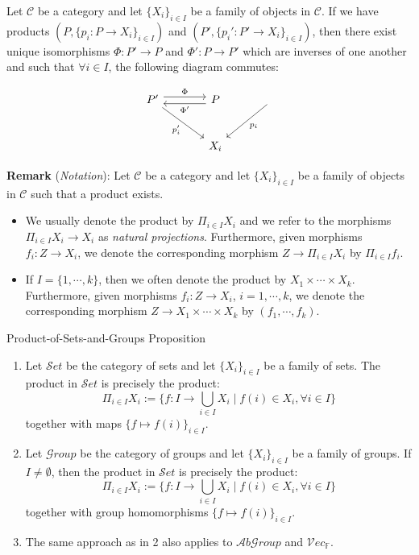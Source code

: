 \begin{proposition}
    Let $\mathcal{C}$ be a category and let $\{ X_i\}_{i \in I}$ be a family of objects in $\mathcal{C}$. If we have products $(P, \{ p_i: P \to X_i\}_{i \in I})$ and $(P', \{ p_i': P' \to X_i\}_{i \in I})$, then there exist unique isomorphisms $\Phi: P' \to P$ and $\Phi': P \to P'$ which are inverses of one another and such that $\forall i \in I$, the following diagram commutes:

    $$\begin{tikzcd}[row sep=large, column sep=large]
        P' \arrow[r, shift left=0.7ex, "\Phi"] \arrow[dr, "p_i'"'] & P \arrow[l, shift left=0.7ex, "\Phi'"] & \arrow[dl, "p_i"] \\
        & X_i
    \end{tikzcd}$$
\end{proposition}

\noindent\textbf{Remark} (\textit{Notation}): Let $\mathcal{C}$ be a category and let $\{ X_i\}_{i \in I}$ be a family of objects in $\mathcal{C}$ such that a product exists.
\begin{itemize}
    \item We usually denote the product by $\Pi_{i \in I} X_i$ and we refer to the morphisms $\Pi_{i \in I} X_i \to X_i$ as \textit{natural projections}. Furthermore, given morphisms $f_i :Z \to X_i$, we denote the corresponding morphism $Z \to \Pi_{i \in I}X_i$ by $\Pi_{i\in I}f_i$.

    \item If $I=\{1,\cdots,k\}$, then we often denote the product by $X_1 \times \cdots \times X_k$. Furthermore, given morphisms $f_i: Z \to X_i$, $i= 1,\cdots,k$, we denote the corresponding morphism $Z \to X_1 \times \cdots \times X_k$ by $(f_1 ,\cdots, f_k)$.
\end{itemize}

\begin{proposition}{Product-of-Sets-and-Groups Proposition}\\
\begin{enumerate}
    \item Let $\mathcal{S}et$ be the category of sets and let $\{ X_i\}_{i \in I}$ be a family of sets. The product in $\mathcal{S}et$ is precisely the product:
    $$\Pi_{i \in I} X_i:= \{f: I\to \bigcup_{i \in I} X_i \mid f(i) \in X_i, \forall i \in I \}$$
    together with maps $\{ f \mapsto f(i) \}_{i\in I}$.
    \item Let $\mathcal{G}roup$ be the category of groups and let $\{ X_i\}_{i \in I}$ be a family of groups. If $I \neq \emptyset$, then the product in $\mathcal{S}et$ is precisely the product:
    $$\Pi_{i \in I} X_i:= \{f: I\to \bigcup_{i \in I} X_i \mid f(i) \in X_i, \forall i \in I \}$$
    together with group homomorphisms $\{ f \mapsto f(i) \}_{i\in I}$.
    \item The same approach as in 2 also applies to $\mathcal{A}b\mathcal{G}roup$ and $\mathcal{V}ec_\mathbb{F}$.
\end{enumerate}
\end{proposition}

